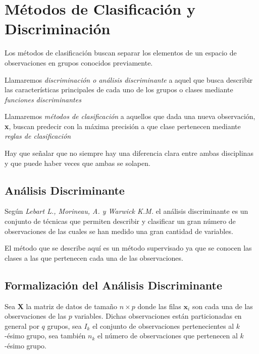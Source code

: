 \newpage
\section{Métodos de Clasificación y Discriminación}

\noindent Los métodos de clasificación buscan separar los elementos de un espacio de observaciones en grupos conocidos previamente. 

\begin{defi}
Llamaremos \textit{discriminación o análisis discriminante} a aquel que busca describir las características principales de cada uno de los grupos o clases mediante \textit{funciones discriminantes} 
\end{defi}

\begin{defi}
Llamaremos \textit{métodos de clasificación} a aquellos que dada una nueva observación, \textbf{x}, buscan predecir con la máxima precisión a que clase pertenecen mediante \textit{reglas de clasificación}
\end{defi}

\noindent Hay que señalar que no siempre hay una diferencia clara entre ambas disciplinas y que puede haber veces que ambas se solapen. 


\subsection{Análisis Discriminante}

\noindent Según \textit{Lebart L., Morineau, A. y Warwick K.M.} \cite{Lebart 1984} el análisis discriminante es un conjunto de técnicas que permiten describir y clasificar un gran número de observaciones de las cuales se han medido una gran cantidad de variables. 

\noindent El método que se describe aquí es un método supervisado ya que se conocen las clases a las que pertenecen cada una de las observaciones. 



\subsection{Formalización del Análisis Discriminante}
 
\noindent Sea \textbf{X} la matriz de datos de tamaño $n \times p$
donde las filas $\textbf{x}_i$ son cada una de las observaciones de las $p$ variables. Dichas observaciones están particionadas en general por $q$ grupos, sea $I_k$ el conjunto de observaciones pertenecientes al $k$-ésimo grupo, sea también $n_k$ el número de observaciones que pertenecen al $k$-ésimo grupo.

